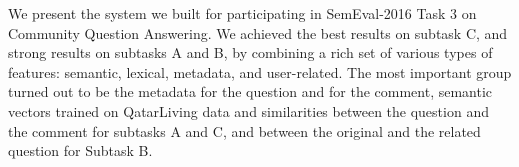 We present the system we built for participating in SemEval-2016 Task 3 on Community Question Answering. We achieved the best results on subtask C, and strong results on subtasks A and B, by combining a rich set of various types of features: semantic, lexical, metadata, and user-related. The most important group turned out to be the metadata for the question and for the comment, semantic vectors trained on QatarLiving data and similarities between the question and the comment for subtasks A and C, and between the original and the related question for Subtask B.
